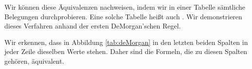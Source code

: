 Wir können diese Äquivalenzen nachweisen, indem wir in einer Tabelle sämtliche Belegungen
durchprobieren.  Eine solche Tabelle heißt auch .
Wir demonstrieren dieses Verfahren anhand der ersten DeMorgan'schen Regel.
\begin{table}[!ht]
  \centering
{}
  \caption{Nachweis der ersten DeMorgan'schen Regel}
  \label{tab:deMorgan}
\end{table}
Wir erkennen, dass in Abbildung \ref{tab:deMorgan} in den letzten beiden Spalten in jeder Zeile dieselben Werte
stehen.  Daher sind die Formeln, die zu diesen Spalten gehören, äquivalent.

